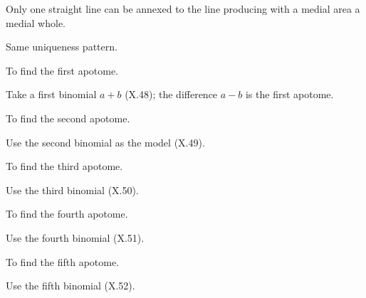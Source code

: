 \begin{claim}
\label{prop:X.84}
Only one straight line can be annexed to the line producing with a
medial area a medial whole.
\end{claim}
\begin{evidence}[Proof of X.84]
\label{ev:X.84}
Same uniqueness pattern.
\end{evidence}

\begin{claim}
\label{prop:X.85}
To find the first apotome.
\end{claim}
\begin{evidence}[Proof of X.85]
\label{ev:X.85}
Take a first binomial $a + b$ (X.48); the difference $a - b$ is the
first apotome.
\end{evidence}

\begin{claim}
\label{prop:X.86}
To find the second apotome.
\end{claim}
\begin{evidence}[Proof of X.86]
\label{ev:X.86}
Use the second binomial as the model (X.49).
\end{evidence}

\begin{claim}
\label{prop:X.87}
To find the third apotome.
\end{claim}
\begin{evidence}[Proof of X.87]
\label{ev:X.87}
Use the third binomial (X.50).
\end{evidence}

\begin{claim}
\label{prop:X.88}
To find the fourth apotome.
\end{claim}
\begin{evidence}[Proof of X.88]
\label{ev:X.88}
Use the fourth binomial (X.51).
\end{evidence}

\begin{claim}
\label{prop:X.89}
To find the fifth apotome.
\end{claim}
\begin{evidence}[Proof of X.89]
\label{ev:X.89}
Use the fifth binomial (X.52).
\end{evidence}

